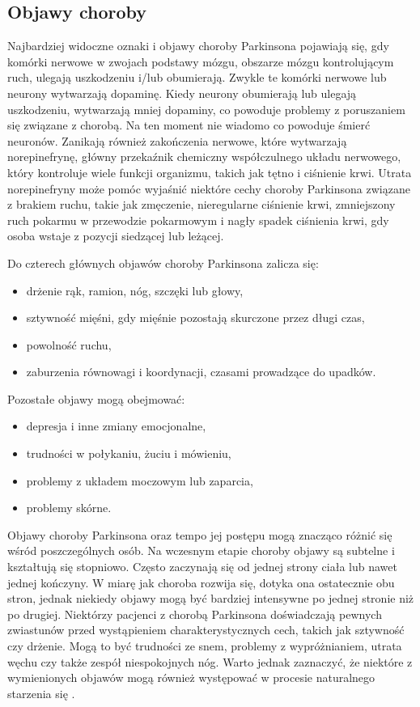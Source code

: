 \subsection{Objawy choroby}
\label{subsec:objawy}

Najbardziej widoczne oznaki i objawy choroby Parkinsona pojawiają się, gdy komórki nerwowe w zwojach podstawy mózgu,
obszarze mózgu kontrolującym ruch, ulegają uszkodzeniu i/lub obumierają.
Zwykle te komórki nerwowe lub neurony wytwarzają dopaminę.
Kiedy neurony obumierają lub ulegają uszkodzeniu, wytwarzają mniej dopaminy, co powoduje problemy z poruszaniem się
związane z chorobą.
Na ten moment nie wiadomo co powoduje śmierć neuronów.
Zanikają również zakończenia nerwowe, które wytwarzają norepinefrynę, główny przekaźnik chemiczny
współczulnego układu nerwowego, który kontroluje wiele funkcji organizmu, takich jak tętno i ciśnienie krwi.
Utrata norepinefryny może pomóc wyjaśnić niektóre cechy choroby Parkinsona związane z brakiem ruchu, takie jak zmęczenie,
nieregularne ciśnienie krwi, zmniejszony ruch pokarmu w przewodzie pokarmowym i nagły spadek ciśnienia krwi, gdy osoba wstaje z pozycji siedzącej lub leżącej.

\vspace{0.5cm}
Do czterech głównych objawów choroby Parkinsona zalicza się:
\begin{itemize}[itemsep=0.05pt]
	\item drżenie rąk, ramion, nóg, szczęki lub głowy,
	\item sztywność mięśni, gdy mięśnie pozostają skurczone przez długi czas,
	\item powolność ruchu,
	\item zaburzenia równowagi i koordynacji, czasami prowadzące do upadków.
\end{itemize}

\vspace{0.15cm}
Pozostałe objawy mogą obejmować:
\begin{itemize}[itemsep=0.05pt]
	\item depresja i inne zmiany emocjonalne,
	\item trudności w połykaniu, żuciu i mówieniu,
	\item problemy z układem moczowym lub zaparcia,
	\item problemy skórne.
\end{itemize}


Objawy choroby Parkinsona oraz tempo jej postępu mogą znacząco różnić się wśród poszczególnych osób.
Na wczesnym etapie choroby objawy są subtelne i kształtują się stopniowo.
Często zaczynają się od jednej strony ciała lub nawet jednej kończyny.
W miarę jak choroba rozwija się, dotyka ona ostatecznie obu stron, jednak niekiedy objawy mogą być bardziej intensywne po jednej stronie niż po drugiej.
Niektórzy pacjenci z chorobą Parkinsona doświadczają pewnych zwiastunów przed wystąpieniem charakterystycznych cech, takich jak sztywność czy drżenie.
Mogą to być trudności ze snem, problemy z wypróżnianiem, utrata węchu czy także zespół niespokojnych nóg.
Warto jednak zaznaczyć, że niektóre z wymienionych objawów mogą również występować w procesie naturalnego starzenia się \cite{National_Institute_on_Aging_2022}.


